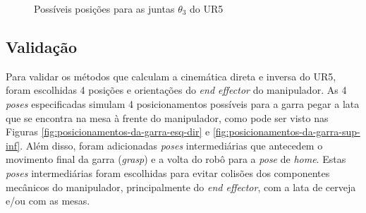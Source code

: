 \begin{figure}[h!]
	\centering
	\caption{Possíveis posições para as juntas $\theta_{3}$ do UR5}
	\label{fig:solucoes-inversa-elbow}
	\hspace{1cm}%
\end{figure}


\FloatBarrier
\subsection{Validação}
Para validar os métodos que calculam a cinemática direta e inversa do UR5, foram escolhidas
4 posições e orientações do \textit{end effector} do manipulador. As 4 \textit{poses} especificadas
simulam 4 posicionamentos possíveis para a garra pegar a lata que se encontra na mesa à frente
do manipulador, como pode ser visto nas Figuras \ref{fig:posicionamentos-da-garra-esq-dir} e 
\ref{fig:posicionamentos-da-garra-sup-inf}. Além disso,
foram adicionadas \textit{poses} intermediárias que antecedem o movimento final da garra
(\textit{grasp}) e a volta do robô para a \textit{pose} de \textit{home}. Estas \textit{poses}
intermediárias foram escolhidas para evitar colisões dos componentes mecânicos do manipulador,
principalmente do \textit{end effector}, com a lata de cerveja e/ou com as mesas.


